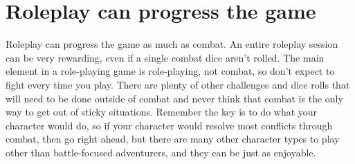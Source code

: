\section{Roleplay can progress the game} \label{sec:roleplay_progress_game}

Roleplay can progress the game as much as combat. An entire roleplay session can be very rewarding, even if a single combat dice aren’t rolled. The main element in a role-playing game is role-playing, not combat, so don’t expect to fight every time you play. There are plenty of other challenges and dice rolls that will need to be done outside of combat and never think that combat is the only way to get out of sticky situations. Remember the key is to do what your character would do, so if your character would resolve most conflicts through combat, then go right ahead, but there are many other character types to play other than battle-focused adventurers, and they can be just as enjoyable.